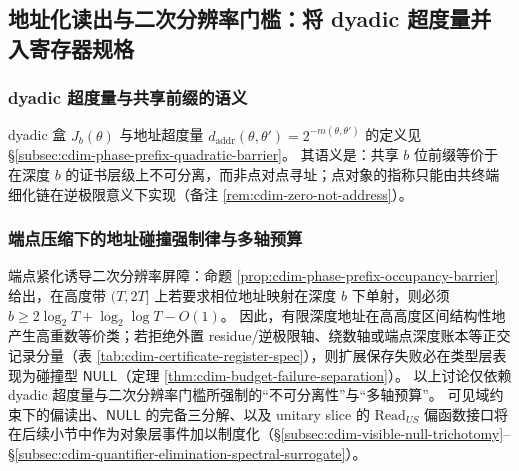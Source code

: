 \subsection{地址化读出与二次分辨率门槛：将 dyadic 超度量并入寄存器规格}\label{subsec:cdim-addressed-readout-quadratic-barrier}
\subsubsection{dyadic 超度量与共享前缀的语义}
dyadic 盒 \(J_b(\theta)\) 与地址超度量 \(d_{\mathrm{addr}}(\theta,\theta')=2^{-m(\theta,\theta')}\) 的定义见 \S\ref{subsec:cdim-phase-prefix-quadratic-barrier}。
其语义是：共享 \(b\) 位前缀等价于在深度 \(b\) 的证书层级上不可分离，而非点对点寻址；点对象的指称只能由共终端细化链在逆极限意义下实现（备注 \ref{rem:cdim-zero-not-address}）。

\subsubsection{端点压缩下的地址碰撞强制律与多轴预算}
端点紧化诱导二次分辨率屏障：命题 \ref{prop:cdim-phase-prefix-occupancy-barrier} 给出，在高度带 \((T,2T]\) 上若要求相位地址映射在深度 \(b\) 下单射，则必须 \(b\ge 2\log_2T+\log_2\log T-O(1)\)。
因此，有限深度地址在高高度区间结构性地产生高重数等价类；若拒绝外置 residue/逆极限轴、绕数轴或端点深度账本等正交记录分量（表 \ref{tab:cdim-certificate-register-spec}），则扩展保存失败必在类型层表现为碰撞型 \(\mathsf{NULL}\)（定理 \ref{thm:cdim-budget-failure-separation}）。
以上讨论仅依赖 dyadic 超度量与二次分辨率门槛所强制的“不可分离性”与“多轴预算”。
可见域约束下的偏读出、\(\mathsf{NULL}\) 的完备三分解、以及 unitary slice 的 \(\mathrm{Read}_{US}\) 偏函数接口将在后续小节中作为对象层事件加以制度化（\S\ref{subsec:cdim-visible-null-trichotomy}--\S\ref{subsec:cdim-quantifier-elimination-spectral-surrogate}）。

